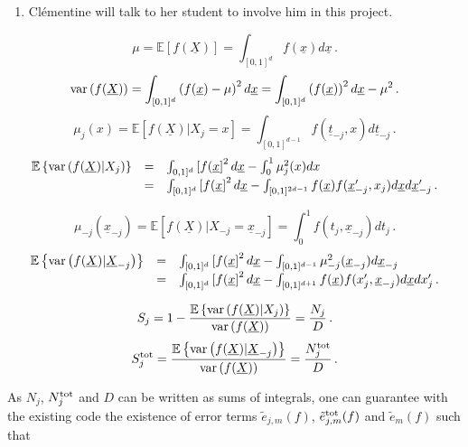 \documentclass[]{amsart}
\newcommand{\oerr}{e}
\begin{document}
\begin{enumerate}
\item Cl\'ementine will talk to her student to involve him in this project.

\end{enumerate}

$$\mu=\mathbb{E}\left[f(\underline{X})\right]=\int_{[0,1]^d} f(\underline{x}) d \underline{x} \, .$$
$$\operatorname{var} \left(f(\underline{X})\right)=\int_{[0,1]^d}\left(f(\underline{x})-\mu\right)^2d \underline{x} =\int_{[0,1]^d}\left(f(\underline{x})\right)^2d \underline{x} - \mu^2 \, .$$
$$\mu_j(x)=\mathbb{E}\left[f(\underline{X})|X_j=x\right]=\int_{[0,1]^{d-1}} f(\underline{t}_{-j},x)d\underline{t}_{-j} \, .$$
$$\begin{array}{rcl}
\mathbb{E}\left\{ \operatorname{var} \left(f(\underline{X})|X_j\right)\right\} & = &\int_{0,1]^d}\left[f(\underline{x}\right]^2 d \underline{x} - \int_0^1 \mu_j^2(x) dx  \\
&=& \int_{[0,1]^d}\left[f(\underline{x}\right]^2 d \underline{x} - \int_{[0,1]^{2d-1}}f(\underline{x})f(\underline{x}'_{-j},x_j)d \underline{x} d \underline{x}'_{-j} \, . 
\end{array}$$

$$\mu_{-j}(\underline{x}_{-j})=\mathbb{E}\left[f(\underline{X})|X_{-j}=\underline{x}_{-j}\right]=\int_0^1 f({t}_{j},\underline{x}_{-j})d {t}_{j} \, .$$
$$\begin{array}{rcl}
\mathbb{E}\left\{ \operatorname{var} \left(f(\underline{X})|\underline{X}_{-j}\right)\right\} & = &\int_{[0,1]^d}\left[f(\underline{x}\right]^2 d \underline{x} - \int_{[0,1]^{d-1}} \mu_{-j}^2(\underline{x}_{-j}) d \underline{x}_{-j}  \\
&=& \int_{[0,1]^d}\left[f(\underline{x}\right]^2 d \underline{x} - \int_{[0,1]^{d+1}}f(\underline{x})f(x'_{j},\underline{x}_{-j})d \underline{x} d {x}'_{j} \, . 
\end{array}$$


\bigskip

$$S_{j}=1-\frac{\mathbb{E}\left\{ \operatorname{var} \left(f(\underline{X})|X_j\right)\right\}}{\operatorname{var}\left(f(\underline{X})\right)}= \frac{N_j}{D}\, .$$
$$S_{j}^{\textup{tot}}=\frac{\mathbb{E}\left\{ \operatorname{var} \left(f(\underline{X})|\underline{X}_{-j}\right)\right\} }{\operatorname{var}\left(f(\underline{X})\right)}=\frac{N_j^{\textup{tot}}}{D}\, .$$


As $N_j$, $N_j^{\textup{tot}}$ and $D$ can be written as sums of integrals,
one can guarantee with the existing code the existence of error terms $\tilde{\oerr}_{j,m}(f)$, $\tilde{\oerr}_{j,m}^{\textup{tot}}(f)$ and $\tilde{\oerr}_m(f)$ such that
\end{document}
